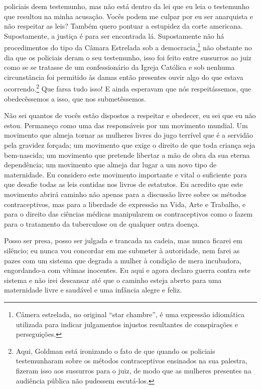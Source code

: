 policiais deem testemunho, mas não está dentro da lei que eu leia o
testemunho que resultou na minha acusação. Vocês podem me culpar por eu
ser anarquista e não respeitar as leis? Também quero pontuar a estupidez
da corte americana. Supostamente, a justiça é para ser encontrada lá.
Supostamente não há procedimentos do tipo da Câmara Estrelada sob a
democracia,\footnote{Câmera estrelada, no original ``star chambre'', é
  uma expressão idiomática utilizada para indicar julgamentos injustos
  resultantes de conspirações e perseguições.} não obstante no dia que
os policiais deram o seu testemunho, isso foi feito entre sussurros ao
juiz como se se tratasse de um confessionário da Igreja Católica e sob
nenhuma circunstância foi permitido às damas então presentes ouvir algo
do que estava ocorrendo.\footnote{Aqui, Goldman está ironizando o fato
  de que quando os policiais testemunharam sobre os métodos
  contraceptivos ensinados na sua palestra, fizeram isso aos sussurros
  para o juiz, de modo que as mulheres presentes na audiência pública
  não pudessem escutá-los.} Que farsa tudo isso! E ainda esperavam que
nós respeitássemos, que obedecêssemos a isso, que nos submetêssemos.

Não sei quantos de vocês estão dispostos a respeitar e obedecer, eu sei
que eu não estou. Permaneço como uma das responsáveis por um movimento
mundial. Um movimento que almeja tornar as mulheres livres do jugo
terrível que é a servidão pela gravidez forçada; um movimento que exige
o direito de que toda criança seja bem-nascida; um movimento que
pretende libertar a mão de obra da sua eterna dependência; um movimento
que almeja dar lugar a um novo tipo de maternidade. Eu considero este
movimento importante e vital o suficiente para que desafie todas as leis
contidas nos livros de estatutos. Eu acredito que este movimento abrirá
caminho não apenas para a discussão livre sobre os métodos
contraceptivos, mas para a liberdade de expressão na Vida, Arte e
Trabalho, e para o direito das ciências médicas manipularem os
contraceptivos como o fazem para o tratamento da tuberculose ou de
qualquer outra doença.

Posso ser presa, posso ser julgada e trancada na cadeia, mas nunca
ficarei em silêncio; eu nunca vou concordar em me submeter à autoridade,
nem farei as pazes com um sistema que degrada a mulher à condição de
mera incubadora, engordando-a com vítimas inocentes. Eu aqui e agora
declaro guerra contra este sistema e não irei descansar até que o
caminho esteja aberto para uma maternidade livre e saudável e uma
infância alegre e feliz.

